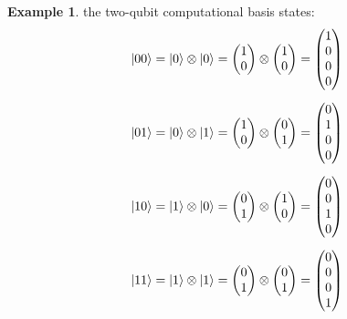 \documentclass[11pt,a4paper]{article}
\theoremstyle{definition}
\newtheorem{example}{Example}[section]
\theoremstyle{remark}
\begin{document}
\begin{example}
the two-qubit computational basis states:
\begin{align}
\ket{00} &= \ket{0} \otimes \ket{0} = \begin{pmatrix} 1 \\ 0 \end{pmatrix} \otimes \begin{pmatrix} 1 \\ 0 \end{pmatrix} = \begin{pmatrix} 1 \\ 0 \\ 0 \\ 0 \end{pmatrix} \\[6pt]
\ket{01} &= \ket{0} \otimes \ket{1} = \begin{pmatrix} 1 \\ 0 \end{pmatrix} \otimes \begin{pmatrix} 0 \\ 1 \end{pmatrix} = \begin{pmatrix} 0 \\ 1 \\ 0 \\ 0 \end{pmatrix} \\[6pt]
\ket{10} &= \ket{1} \otimes \ket{0} = \begin{pmatrix} 0 \\ 1 \end{pmatrix} \otimes \begin{pmatrix} 1 \\ 0 \end{pmatrix} = \begin{pmatrix} 0 \\ 0 \\ 1 \\ 0 \end{pmatrix} \\[6pt]
\ket{11} &= \ket{1} \otimes \ket{1} = \begin{pmatrix} 0 \\ 1 \end{pmatrix} \otimes \begin{pmatrix} 0 \\ 1 \end{pmatrix} = \begin{pmatrix} 0 \\ 0 \\ 0 \\ 1 \end{pmatrix}
\end{align}
\end{example}
\end{document}
